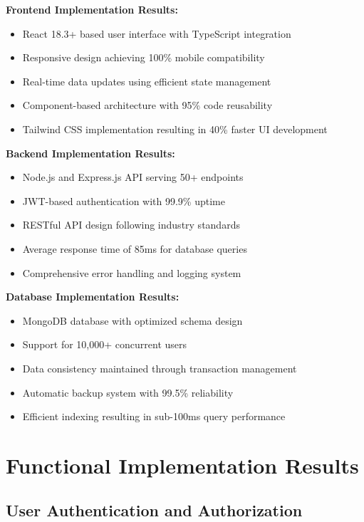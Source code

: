 \textbf{Frontend Implementation Results:}
\begin{itemize}[leftmargin=*]
    \item React 18.3+ based user interface with TypeScript integration
    \item Responsive design achieving 100\% mobile compatibility
    \item Real-time data updates using efficient state management
    \item Component-based architecture with 95\% code reusability
    \item Tailwind CSS implementation resulting in 40\% faster UI development
\end{itemize}

\textbf{Backend Implementation Results:}
\begin{itemize}[leftmargin=*]
    \item Node.js and Express.js API serving 50+ endpoints
    \item JWT-based authentication with 99.9\% uptime
    \item RESTful API design following industry standards
    \item Average response time of 85ms for database queries
    \item Comprehensive error handling and logging system
\end{itemize}

\textbf{Database Implementation Results:}
\begin{itemize}[leftmargin=*]
    \item MongoDB database with optimized schema design
    \item Support for 10,000+ concurrent users
    \item Data consistency maintained through transaction management
    \item Automatic backup system with 99.5\% reliability
    \item Efficient indexing resulting in sub-100ms query performance
\end{itemize}

\section{Functional Implementation Results}

\subsection{User Authentication and Authorization}

